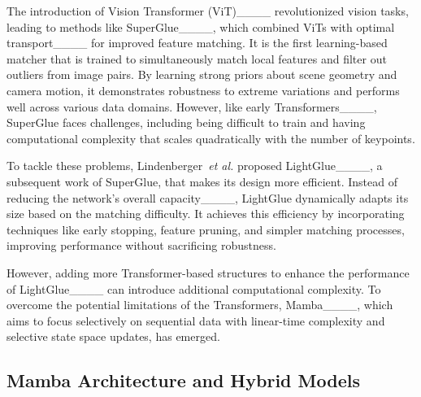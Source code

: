 The introduction of Vision Transformer (ViT)____ revolutionized vision tasks, leading to methods like SuperGlue____, which combined ViTs with optimal transport____ for improved feature matching. It is the first learning-based matcher that is trained to simultaneously match local features and filter out outliers from image pairs. By learning strong priors about scene geometry and camera motion, it demonstrates robustness to extreme variations and performs well across various data domains. However, like early Transformers____, SuperGlue faces challenges, including being difficult to train and having computational complexity that scales quadratically with the number of keypoints.


To tackle these problems, Lindenberger~\textit{et al.} proposed LightGlue____, a subsequent work of SuperGlue, that makes its design more efficient. Instead of reducing the network's overall capacity____, LightGlue dynamically adapts its size based on the matching difficulty. It achieves this efficiency by incorporating techniques like early stopping, feature pruning, and simpler matching processes, improving performance without sacrificing robustness.


However, adding more Transformer-based structures to enhance the performance of LightGlue____ can introduce additional computational complexity. To overcome the potential limitations of the Transformers, Mamba____, which aims to focus selectively on sequential data with linear-time complexity and selective state space updates, has emerged.

\subsection{Mamba Architecture and Hybrid Models}

